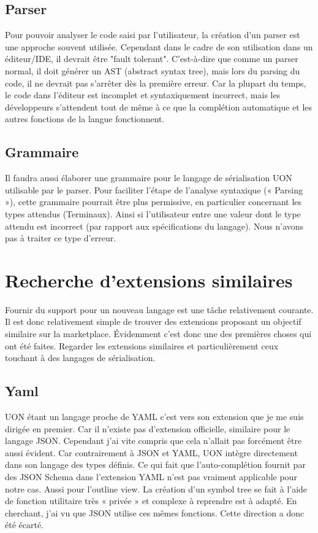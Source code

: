 \documentclass[
    iict, %
    il, %
]{heig-tb}
\begin{document}
\subsection{Parser}
Pour pouvoir analyser le code saisi par l’utilisateur, la création d’un parser est une approche souvent utilisée.
Cependant dans le cadre de son utilisation dans un éditeur/IDE, il devrait être "fault tolerant". C’est-à-dire que comme un parser normal, il doit générer un AST (abstract syntax tree), mais lors du parsing du code, il ne devrait pas s’arrêter dès la première erreur.
Car la plupart du temps, le code dans l'éditeur est incomplet et syntaxiquement incorrect, mais les développeurs s'attendent tout de même à ce que la complétion automatique et les autres fonctions de la langue fonctionnent.


\subsection{Grammaire}
Il faudra aussi élaborer une grammaire pour le langage de sérialisation UON utilisable par le parser.
Pour faciliter l’étape de l’analyse syntaxique (« Parsing »), cette grammaire pourrait être plus permissive, en particulier concernant les types attendus (Terminaux). Ainsi si l’utilisateur entre une valeur dont le type attendu est incorrect (par rapport aux spécifications du langage). Nous n’avons pas à traiter ce type d’erreur.

\section{Recherche d'extensions similaires}
Fournir du support pour un nouveau langage est une tâche relativement courante.
Il est donc relativement simple de trouver des extensions proposant un objectif similaire sur la marketplace.
Évidemment c’est donc une des premières choses qui ont été faites. Regarder les extensions similaires et particulièrement ceux touchant à des langages de sérialisation.

\subsection{Yaml}
UON étant un langage proche de YAML c’est vers son extension que je me suis dirigée en premier. Car il n’existe pas d’extension officielle, similaire pour le langage JSON.
Cependant j’ai vite compris que cela n’allait pas forcément être aussi évident. Car contrairement à JSON et YAML, UON intègre directement dans son langage des types définis. Ce qui fait que l’auto-complétion fournit par des JSON Schema dans l’extension YAML n’est pas vraiment applicable pour notre cas.
Aussi pour l’outline view. La création d’un symbol tree se fait à l’aide de fonction utilitaire très « privée » et complexe à reprendre est à adapté. En cherchant, j’ai vu que JSON utilise ces mêmes fonctions.
Cette direction a donc été écarté.
\end{document}
